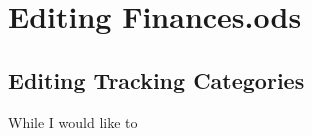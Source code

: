 \section{Editing Finances.ods}
\label{sec:editing-finances.ods}

\subsection{Editing Tracking Categories}
\label{subsec:editing-tracking-categories}

While I would like to 